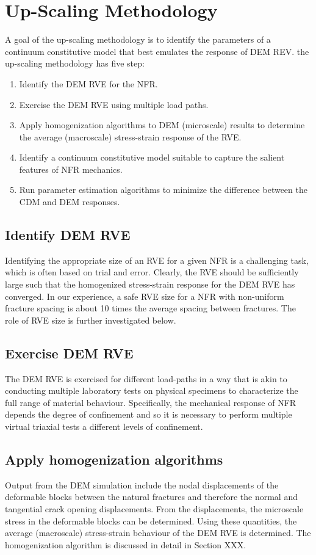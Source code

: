 \section{Up-Scaling Methodology}
A goal of the up-scaling methodology is to identify the parameters of a continuum constitutive model that best emulates the response of DEM REV. the up-scaling methodology has five step: 
\begin{enumerate}
    \item Identify the DEM RVE for the NFR.
	\item Exercise the  DEM RVE using multiple load paths.
	\item Apply homogenization algorithms to DEM (microscale) results to determine the average (macroscale) stress-strain response of the RVE.
	\item Identify a continuum constitutive model suitable to capture the salient features of NFR mechanics.
	\item Run parameter estimation algorithms to minimize the difference between the CDM and DEM responses.
\end{enumerate}

\subsection*{Identify DEM RVE}
Identifying the appropriate size of an RVE for a given NFR is a challenging task, which is often based on trial and error. Clearly, the RVE should be sufficiently large such that the homogenized stress-strain response for the DEM RVE has converged. In our experience, a safe RVE size for a NFR with non-uniform fracture spacing is about 10 times the average spacing between fractures. The role of RVE size is further investigated below.

\subsection*{Exercise DEM RVE}
The DEM RVE is exercised for different load-paths in a way that is akin  to conducting multiple laboratory tests on physical specimens to characterize the full range of material behaviour. Specifically, the mechanical response of NFR depends the degree of confinement and so it is necessary to perform multiple virtual triaxial tests a different levels of confinement. 

\subsection*{Apply homogenization algorithms}
Output from the DEM simulation include the nodal displacements of the deformable blocks between the natural fractures and therefore the normal and tangential crack opening displacements. From the displacements, the microscale stress in the deformable blocks can be determined.  Using these quantities, the average (macroscale) stress-strain behaviour of the DEM RVE is determined. The homogenization algorithm is discussed in detail in Section XXX.

